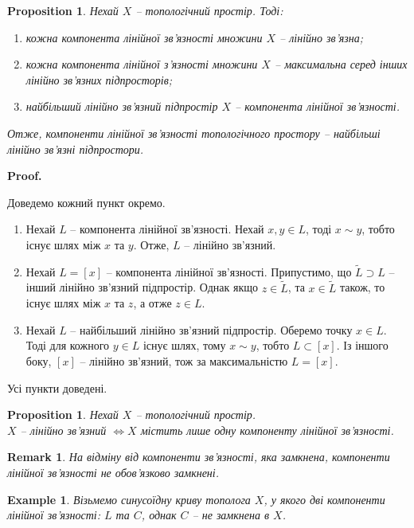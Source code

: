 \documentclass[a4paper, 10pt]{article}
\makeatletter
\theoremstyle{theoremdd}
\newtheorem{example}[theorem]{Example}
\newtheorem{proposition}[theorem]{Proposition}
\newtheorem{remark}[theorem]{Remark}
\renewenvironment{proof}[1][Proof.\\]{\par
\pushQED{\hfill \qed}%
\normalfont \topsep6\p@\@plus6\p@\relax
\trivlist
\item\relax
{\bfseries
#1\@addpunct{.}}\hspace\labelsep\ignorespaces
}{%
\popQED\endtrivlist\@endpefalse
}
\makeatother
\begin{document}
\begin{proposition}
Нехай $X$ -- топологічний простір. Тоді:
\begin{enumerate}[nosep, wide=0pt, label={\arabic*)}]
\item кожна компонента лінійної зв'язності множини $X$ -- лінійно зв'язна;
\item кожна компонента лінійної з'язності множини $X$ -- максимальна серед інших лінійно зв'язних підпросторів;
\item найбільший лінійно зв'язний підпростір $X$ -- компонента лінійної зв'язності.
\end{enumerate}
Отже, компоненти лінійної зв'язності топологічного простору -- найбільші лінійно зв'язні підпростори.
\end{proposition}

\begin{proof}
Доведемо кожний пункт окремо.
\begin{enumerate}[wide=0pt,label={\arabic*)}]
\item Нехай $L$ -- компонента лінійної зв'язності. Нехай $x,y \in L$, тоді $x \sim y$, тобто існує шлях між $x$ та $y$. Отже, $L$ -- лінійно зв'язний.

\item Нехай $L = [x]$ -- компонента лінійної зв'язності. Припустимо, що $\tilde{L} \supset L$ -- інший лінійно зв'язний підпростір. Однак якщо $z \in \tilde{L}$, та $x \in \tilde{L}$ також, то існує шлях між $x$ та $z$, а отже $z \in L$.

\item Нехай $L$ -- найбільший лінійно зв'язний підпростір. Оберемо точку $x \in L$. Тоді для кожного $y \in L$ існує шлях, тому $x \sim y$, тобто $L \subset [x]$. Із іншого боку, $[x]$ -- лінійно зв'язний, тож за максимальністю $L = [x]$. 
\end{enumerate}
Усі пункти доведені.
\end{proof}

\begin{proposition}
Нехай $X$ -- топологічний простір.\\
$X$ -- лінійно зв'язний $\iff X$ містить лише одну компоненту лінійної зв'язності.
\end{proposition}

\begin{remark}
На відміну від компоненти зв'язності, яка замкнена, компоненти лінійної зв'язності не обов'язково замкнені.
\end{remark}

\begin{example}
Візьмемо синусоїдну криву тополога $X$, у якого дві компоненти лінійної зв'язності: $L$ та $C$, однак $C$ -- не замкнена в $X$.
\end{example}
\end{document}
